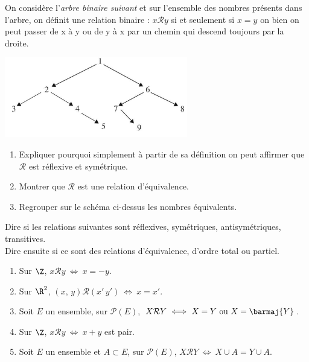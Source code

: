 \begin{exercice}[]
    On considère l'\textit{arbre binaire suivant} et sur l'ensemble des nombres présents dans l'arbre, on définit une relation binaire : $x\mathcal{R}y$ si et seulement si $x=y$ on bien on peut passer de x à y ou de y à x par un chemin qui descend toujours par la droite.
    \begin{center}
        \includegraphics[width=8cm]{ensembles/img/arbre.PNG}
    \end{center}
    \begin{enumerate}
        \item 	Expliquer pourquoi simplement à partir de sa définition on peut affirmer que $\mathcal{R}$ est réflexive et symétrique.
        \item 	Montrer que $\mathcal{R}$ est une relation d'équivalence.
        \item 	Regrouper sur le schéma ci-dessus les nombres équivalents.
    \end{enumerate}
\end{exercice}

\begin{exercice}
    Dire si les relations suivantes sont réflexives, symétriques, antisymétriques, transitives.\\
    Dire ensuite si ce sont des relations d'équivalence, d'ordre total ou partiel.
    \begin{enumerate}
        \item 	Sur $\Z$, $x\mathcal{R}y\ \Longleftrightarrow\  x=-y$.
        \item 	Sur $\R^2$, $(x,\,y)\mathcal{R}(x'\,y')\ \Longleftrightarrow\ x=x'$.
        \item 	Soit $E$ un ensemble, sur $\mathcal{P}(E)$, $X\mathcal{R}Y\ \Longleftrightarrow\ X=Y\ \text{ou}\ X = \barmaj{Y}$.
        \item 	Sur $\Z$, $x\mathcal{R}y\ \Longleftrightarrow\  x+y$ est pair.
        \item 	Soit $E$ un ensemble et $A\subset E$, sur $\mathcal{P}(E)$, $X\mathcal{R}Y\ \Longleftrightarrow\ X\cup A=Y\cup A$.
    \end{enumerate}
\end{exercice}
